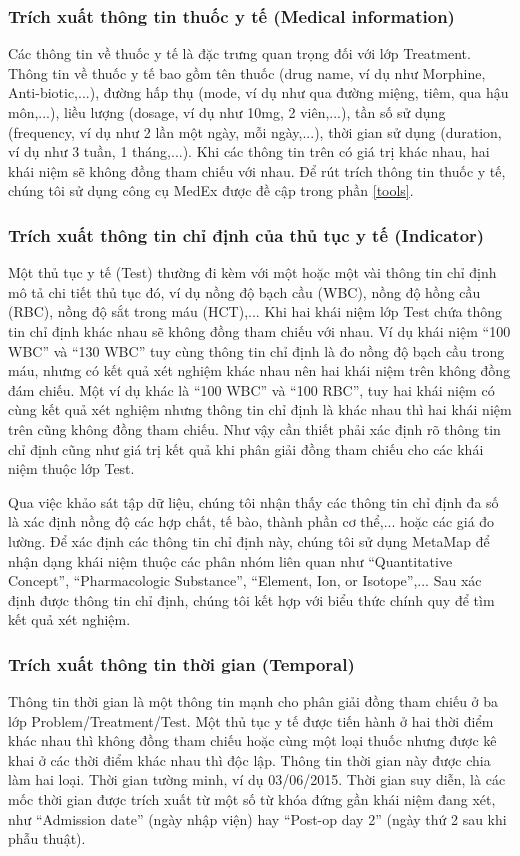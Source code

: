 \subsubsection*{Trích xuất thông tin thuốc y tế (Medical information)}
Các thông tin về thuốc y tế là đặc trưng quan trọng đối với lớp Treatment. Thông tin về thuốc y tế bao gồm tên thuốc (drug name, ví dụ như Morphine, Anti-biotic,...), đường hấp thụ (mode, ví dụ như qua đường miệng, tiêm, qua hậu môn,...), liều lượng (dosage, ví dụ như 10mg, 2 viên,...), tần số sử dụng (frequency, ví dụ như 2 lần một ngày, mỗi ngày,...), thời gian sử dụng (duration, ví dụ như 3 tuần, 1 tháng,...). Khi các thông tin trên có giá trị khác nhau, hai khái niệm sẽ không đồng tham chiếu với nhau. Để rút trích thông tin thuốc y tế, chúng tôi sử dụng công cụ MedEx được đề cập trong phần \ref{tools}.

\subsubsection*{Trích xuất thông tin chỉ định của thủ tục y tế (Indicator)}
Một thủ tục y tế (Test) thường đi kèm với một hoặc một vài thông tin chỉ định mô tả chi tiết thủ tục đó, ví dụ nồng độ bạch cầu (WBC), nồng độ hồng cầu (RBC), nồng độ sắt trong máu (HCT),... Khi hai khái niệm lớp Test chứa thông tin chỉ định khác nhau sẽ không đồng tham chiếu với nhau. Ví dụ khái niệm ``100 WBC'' và ``130 WBC'' tuy cùng thông tin chỉ định là đo nồng độ bạch cầu trong máu, nhưng có kết quả xét nghiệm khác nhau nên hai khái niệm trên không đồng đám chiếu. Một ví dụ khác là ``100 WBC'' và ``100 RBC'', tuy hai khái niệm có cùng kết quả xét nghiệm nhưng thông tin chỉ định là khác nhau thì hai khái niệm trên cũng không đồng tham chiếu. Như vậy cần thiết phải xác định rõ thông tin chỉ định cũng như giá trị kết quả khi phân giải đồng tham chiếu cho các khái niệm thuộc lớp Test.

Qua việc khảo sát tập dữ liệu, chúng tôi nhận thấy các thông tin chỉ định đa số là xác định nồng độ các hợp chất, tế bào, thành phần cơ thể,... hoặc các giá đo lường. Để xác định các thông tin chỉ định này, chúng tôi sử dụng MetaMap để nhận dạng khái niệm thuộc các phân nhóm liên quan như ``Quantitative Concept'', ``Pharmacologic Substance'', ``Element, Ion, or Isotope'',... Sau xác định được thông tin chỉ định, chúng tôi kết hợp với biểu thức chính quy để tìm kết quả xét nghiệm.

\subsubsection*{Trích xuất thông tin thời gian (Temporal)}
Thông tin thời gian là một thông tin mạnh cho phân giải đồng tham chiếu ở ba lớp Problem/Treatment/Test. Một thủ tục y tế được tiến hành ở hai thời điểm khác nhau thì không đồng tham chiếu hoặc cùng một loại thuốc nhưng được kê khai ở các thời điểm khác nhau thì độc lập. Thông tin thời gian này được chia làm hai loại. Thời gian tường minh, ví dụ 03/06/2015. Thời gian suy diễn, là các mốc thời gian được trích xuất từ một số từ khóa đứng gần khái niệm đang xét, như ``Admission date'' (ngày nhập viện) hay ``Post-op day 2'' (ngày thứ 2 sau khi phẫu thuật).

